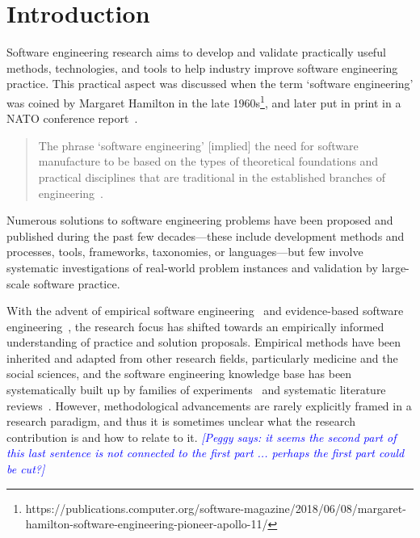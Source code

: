 \documentclass[graybox]{svmult}
\newcommand{\peggy}[1]{\textcolor{blue}{{\it [Peggy says: #1]}}}
\newcommand{\peggy}[1]{}
\begin{document}
\section{Introduction}
\label{sec:intro}

Software engineering research aims to develop and validate practically useful methods, technologies, and tools to help industry improve software engineering practice. This practical aspect was discussed when the term `software engineering' was coined by Margaret Hamilton in the late 1960s\footnote{https://publications.computer.org/software-magazine/2018/06/08/margaret-hamilton-software-engineering-pioneer-apollo-11/}, and later put in print in a NATO conference report~\cite{Nato1968}. 

\begin{quote}
{The phrase `software engineering'  [implied] the need for software manufacture to be based on the types of theoretical foundations and practical disciplines that are traditional in the established branches of engineering}~\cite[p. 13]{Nato1968}. 
\end{quote}

Numerous solutions to software engineering problems have been proposed and published during the past few decades---these include development methods and processes, tools, frameworks, taxonomies, or languages---but few involve systematic investigations of real-world problem instances and validation by large-scale software practice.

With the advent of empirical software engineering~\cite{Basili86} and evidence-based software engineering~\cite{Kitchenham04}, the research focus has shifted towards an empirically informed understanding of practice and solution proposals. Empirical methods have been inherited and adapted from other research fields, particularly medicine and the social sciences, and the software engineering knowledge base has been systematically built up by families of experiments~\cite{Basili99} and systematic literature reviews~\cite{Kitchenham15}. However, methodological advancements are rarely explicitly framed in a research paradigm, and thus it is sometimes unclear what the research contribution is and how to relate to it. 
\peggy{it seems the second part of this last sentence is not connected to the first part ... perhaps the first part could be cut?}
\end{document}
